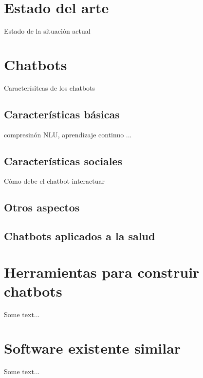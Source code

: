 \section{Estado del arte}
Estado de la situación actual

\section{Chatbots}
Caracterísitcas de los chatbots
\subsection{Características básicas}
compresinón NLU, aprendizaje continuo ...

\subsection{Características sociales} 
Cómo debe el chatbot interactuar

\subsection{Otros aspectos} 


\subsection{Chatbots aplicados a la salud} 

\section{Herramientas para construir chatbots}
Some text...

\section{Software existente similar}
Some text... 
